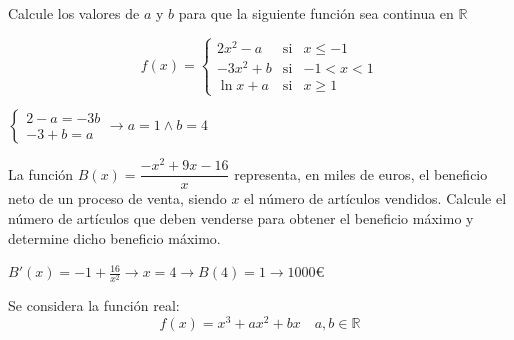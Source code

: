 \documentclass[addpoints,spanish, 12pt,a4paper]{exam}
\begin{document}
\begin{questions}

%
%
%

\question[1] Calcule los valores de \( a \) y \( b \) para que la siguiente función  sea continua en $\mathbb{R}$


\[
f(x) = \left\{
\begin{matrix}
2x^2 - a & \text{si} & x \leq -1 \\ 
-3x^2 + b & \text{si} & -1 < x < 1 \\ 
\ln x + a  & \text{si} & x \geq 1 
\end{matrix} \right.
\]
\begin{solution}
    $\left\{\begin{matrix}
        2-a=-3b\\
        -3+b=a
    \end{matrix}\right. \to a=1 \land b=4$
\end{solution}


\question[2] La función $B(x) = \dfrac{-x^2 + 9x - 16}{x}$ representa, en miles de euros, el beneficio neto de un proceso de venta, siendo \( x \) el número de artículos vendidos. Calcule el número de artículos que deben venderse para obtener el beneficio máximo y determine dicho beneficio máximo.
\begin{solution}
    $B'(x)=-1 + \frac{16}{x^{2}} \to x=4 \to B(4)=1 \to 1000 \euro$
\end{solution}

\question Se considera la función real:
\[
f(x) = x^3 + ax^2 + bx \quad a, b \in \mathbb{R}
\]

\end{questions}
\end{document}
